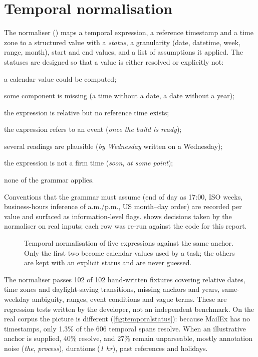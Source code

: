 \section{Temporal normalisation}
\label{sec:temporal}
The normaliser () maps a temporal expression, a reference timestamp and a time zone to a structured value with a \emph{status}, a granularity (date, datetime, week, range, month), start and end values, and a list of assumptions it applied. The statuses are designed so that a value is either resolved or explicitly not:
\begin{description}[leftmargin=1.6em, font=\normalfont\sffamily\small\bfseries\color{navy}]
  \item[RESOLVED] a calendar value could be computed;
  \item[PARTIAL] some component is missing (a time without a date, a date without a year);
  \item[UNRESOLVED\_NO\_ANCHOR] the expression is relative but no reference time exists;
  \item[UNRESOLVED\_EVENT\_CONDITION] the expression refers to an event (\emph{once the build is ready});
  \item[AMBIGUOUS] several readings are plausible (\emph{by Wednesday} written on a Wednesday);
  \item[VAGUE] the expression is not a firm time (\emph{soon}, \emph{at some point});
  \item[UNPARSEABLE] none of the grammar applies.
\end{description}
Conventions that the grammar must assume (end of day as 17:00, ISO weeks, business-hours inference of a.m./p.m., US month--day order) are recorded per value and surfaced as information-level flags.  shows decisions taken by the normaliser on real inputs; each row was re-run against the code for this report.

\begin{figure}[t]
\centering
{}
\caption[Temporal normalisation decisions]{Temporal normalisation of five expressions against the same anchor. Only the first two become calendar values used by a task; the others are kept with an explicit status and are never guessed.}
\label{fig:temporal}
\end{figure}

The normaliser passes 102 of 102 hand-written fixtures covering relative dates, time zones and daylight-saving transitions, missing anchors and years, same-weekday ambiguity, ranges, event conditions and vague terms. These are regression tests written by the developer, not an independent benchmark. On the real corpus the picture is different (\cref{fig:temporalstatus}): because MailEx has no timestamps, only 1.3\% of the 606 temporal spans resolve. When an illustrative anchor is supplied, 40\% resolve, and 27\% remain unparseable, mostly annotation noise (\emph{the}, \emph{process}), durations (\emph{1 hr}), past references and holidays.

